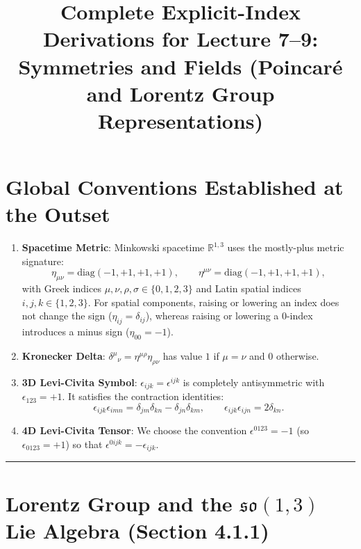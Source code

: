 \documentclass[11pt,a4paper]{article}
\title{\textbf{Complete Explicit-Index Derivations for Lecture 7--9:\\ Symmetries and Fields (Poincar\'e and Lorentz Group Representations)}}
\author{}
\date{}
\begin{document}
\maketitle

\section*{Global Conventions Established at the Outset}
\begin{enumerate}[label=\textbf{\arabic*.}]
    \item \textbf{Spacetime Metric}: Minkowski spacetime $\mathbb{R}^{1,3}$ uses the mostly-plus metric signature:
    \begin{equation}
        \eta_{\mu\nu} = \mathrm{diag}(-1, +1, +1, +1), \qquad \eta^{\mu\nu} = \mathrm{diag}(-1, +1, +1, +1),
    \end{equation}
    with Greek indices $\mu,\nu,\rho,\sigma \in \{0,1,2,3\}$ and Latin spatial indices $i,j,k \in \{1,2,3\}$. For spatial components, raising or lowering an index does not change the sign ($\eta_{ij} = \delta_{ij}$), whereas raising or lowering a $0$-index introduces a minus sign ($\eta_{00} = -1$).
    \item \textbf{Kronecker Delta}: $\delta^\mu{}_\nu = \eta^{\mu\rho}\eta_{\rho\nu}$ has value $1$ if $\mu=\nu$ and $0$ otherwise.
    \item \textbf{3D Levi-Civita Symbol}: $\epsilon_{ijk} = \epsilon^{ijk}$ is completely antisymmetric with $\epsilon_{123} = +1$. It satisfies the contraction identities:
    \begin{equation}
        \epsilon_{ijk}\epsilon_{imn} = \delta_{jm}\delta_{kn} - \delta_{jn}\delta_{km}, \qquad \epsilon_{ijk}\epsilon_{ijn} = 2\delta_{kn}.
    \end{equation}
    \item \textbf{4D Levi-Civita Tensor}: We choose the convention $\epsilon^{0123} = -1$ (so $\epsilon_{0123} = +1$) so that $\epsilon^{0ijk} = -\epsilon_{ijk}$.
\end{enumerate}

\vspace{0.5em}\hrule\vspace{1em}

\section{Lorentz Group and the $\mathfrak{so}(1,3)$ Lie Algebra (Section 4.1.1)}
\end{document}
